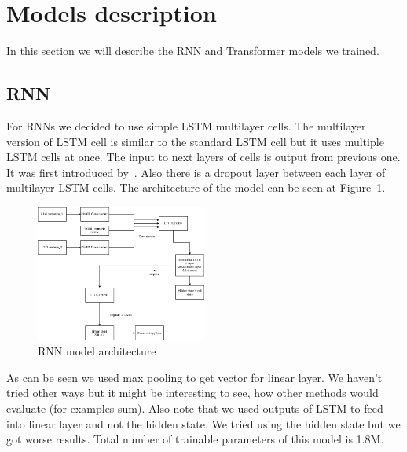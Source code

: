 \documentclass{article}
\begin{document}
    \section{Models description}
    In this section we will describe the RNN and Transformer models we trained.

    \subsection{RNN}
    For RNNs we decided to use simple LSTM multilayer cells.
    The multilayer version of LSTM cell is similar to the standard LSTM cell but it uses multiple LSTM cells at once.
    The input to next layers of cells is output from previous one. It was first introduced by~\cite{gravesSpeechRecognitionDeep2013}.
    Also there is a dropout layer between each layer of multilayer-LSTM cells.
    The architecture of the model can be seen at Figure~\ref{fig:rnn_model}.\\
    \begin{figure}[h!]
        \centering
        \includegraphics[width=0.5\textwidth]{LSTM.png}
        \caption{RNN model architecture}
        \label{fig:rnn_model}
    \end{figure}
    As can be seen we used max pooling to get vector for linear layer.
    We haven't tried other ways but it might be interesting to see, how other methods would evaluate (for examples sum).
    Also note that we used outputs of LSTM to feed into linear layer and not the hidden state.
    We tried using the hidden state but we got worse results.
    Total number of trainable parameters of this model is 1.8M.
\end{document}
